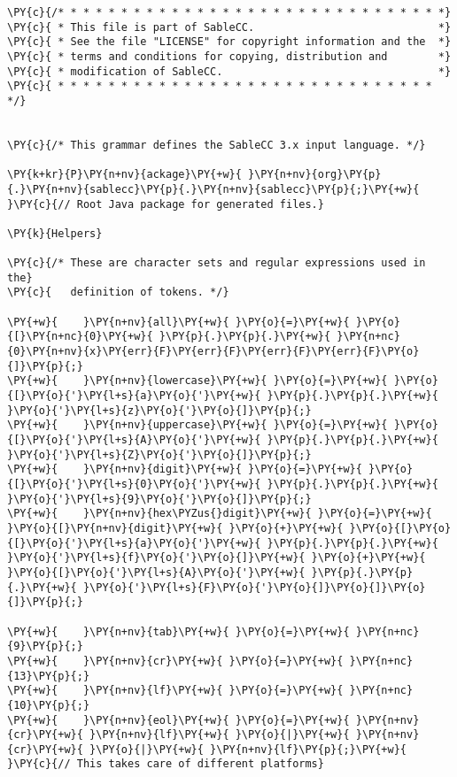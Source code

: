 \begin{Verbatim}[commandchars=\\\{\}]
\PY{c}{/* * * * * * * * * * * * * * * * * * * * * * * * * * * * * * *}
\PY{c}{ * This file is part of SableCC.                             *}
\PY{c}{ * See the file "LICENSE" for copyright information and the  *}
\PY{c}{ * terms and conditions for copying, distribution and        *}
\PY{c}{ * modification of SableCC.                                  *}
\PY{c}{ * * * * * * * * * * * * * * * * * * * * * * * * * * * * * * */}


\PY{c}{/* This grammar defines the SableCC 3.x input language. */}

\PY{k+kr}{P}\PY{n+nv}{ackage}\PY{+w}{ }\PY{n+nv}{org}\PY{p}{.}\PY{n+nv}{sablecc}\PY{p}{.}\PY{n+nv}{sablecc}\PY{p}{;}\PY{+w}{ }\PY{c}{// Root Java package for generated files.}

\PY{k}{Helpers}

\PY{c}{/* These are character sets and regular expressions used in the}
\PY{c}{   definition of tokens. */}

\PY{+w}{    }\PY{n+nv}{all}\PY{+w}{ }\PY{o}{=}\PY{+w}{ }\PY{o}{[}\PY{n+nc}{0}\PY{+w}{ }\PY{p}{.}\PY{p}{.}\PY{+w}{ }\PY{n+nc}{0}\PY{n+nv}{x}\PY{err}{F}\PY{err}{F}\PY{err}{F}\PY{err}{F}\PY{o}{]}\PY{p}{;}
\PY{+w}{    }\PY{n+nv}{lowercase}\PY{+w}{ }\PY{o}{=}\PY{+w}{ }\PY{o}{[}\PY{o}{'}\PY{l+s}{a}\PY{o}{'}\PY{+w}{ }\PY{p}{.}\PY{p}{.}\PY{+w}{ }\PY{o}{'}\PY{l+s}{z}\PY{o}{'}\PY{o}{]}\PY{p}{;}
\PY{+w}{    }\PY{n+nv}{uppercase}\PY{+w}{ }\PY{o}{=}\PY{+w}{ }\PY{o}{[}\PY{o}{'}\PY{l+s}{A}\PY{o}{'}\PY{+w}{ }\PY{p}{.}\PY{p}{.}\PY{+w}{ }\PY{o}{'}\PY{l+s}{Z}\PY{o}{'}\PY{o}{]}\PY{p}{;}
\PY{+w}{    }\PY{n+nv}{digit}\PY{+w}{ }\PY{o}{=}\PY{+w}{ }\PY{o}{[}\PY{o}{'}\PY{l+s}{0}\PY{o}{'}\PY{+w}{ }\PY{p}{.}\PY{p}{.}\PY{+w}{ }\PY{o}{'}\PY{l+s}{9}\PY{o}{'}\PY{o}{]}\PY{p}{;}
\PY{+w}{    }\PY{n+nv}{hex\PYZus{}digit}\PY{+w}{ }\PY{o}{=}\PY{+w}{ }\PY{o}{[}\PY{n+nv}{digit}\PY{+w}{ }\PY{o}{+}\PY{+w}{ }\PY{o}{[}\PY{o}{[}\PY{o}{'}\PY{l+s}{a}\PY{o}{'}\PY{+w}{ }\PY{p}{.}\PY{p}{.}\PY{+w}{ }\PY{o}{'}\PY{l+s}{f}\PY{o}{'}\PY{o}{]}\PY{+w}{ }\PY{o}{+}\PY{+w}{ }\PY{o}{[}\PY{o}{'}\PY{l+s}{A}\PY{o}{'}\PY{+w}{ }\PY{p}{.}\PY{p}{.}\PY{+w}{ }\PY{o}{'}\PY{l+s}{F}\PY{o}{'}\PY{o}{]}\PY{o}{]}\PY{o}{]}\PY{p}{;}

\PY{+w}{    }\PY{n+nv}{tab}\PY{+w}{ }\PY{o}{=}\PY{+w}{ }\PY{n+nc}{9}\PY{p}{;}
\PY{+w}{    }\PY{n+nv}{cr}\PY{+w}{ }\PY{o}{=}\PY{+w}{ }\PY{n+nc}{13}\PY{p}{;}
\PY{+w}{    }\PY{n+nv}{lf}\PY{+w}{ }\PY{o}{=}\PY{+w}{ }\PY{n+nc}{10}\PY{p}{;}
\PY{+w}{    }\PY{n+nv}{eol}\PY{+w}{ }\PY{o}{=}\PY{+w}{ }\PY{n+nv}{cr}\PY{+w}{ }\PY{n+nv}{lf}\PY{+w}{ }\PY{o}{|}\PY{+w}{ }\PY{n+nv}{cr}\PY{+w}{ }\PY{o}{|}\PY{+w}{ }\PY{n+nv}{lf}\PY{p}{;}\PY{+w}{ }\PY{c}{// This takes care of different platforms}


\end{Verbatim}

